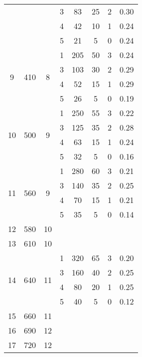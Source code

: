 \begin{longtable}[c]{|c|c|c|c|c|c|c|c|}
    & & & 3 & 83 & 25 & 2 & 0.30 \\\cline{4-8}
    & & & 4 & 42 & 10 & 1 & 0.24 \\\cline{4-8}
    & & & 5 & 21 & 5 & 0 & 0.24 \\\hline
    \multirow{4}{*}{9} & \multirow{4}{*}{410} & \multirow{4}{*}{8} & 1 & 205 & 50 & 3 & 0.24 \\\cline{4-8}
    & & & 3 & 103 & 30 & 2 & 0.29 \\\cline{4-8}
    & & & 4 & 52 & 15 & 1 & 0.29 \\\cline{4-8}
    & & & 5 & 26 & 5 & 0 & 0.19 \\\hline
    \multirow{4}{*}{10} & \multirow{4}{*}{500} & \multirow{4}{*}{9} & 1 & 250 & 55 & 3 & 0.22 \\\cline{4-8}
    & & & 3 & 125 & 35 & 2 & 0.28 \\\cline{4-8}
    & & & 4 & 63 & 15 & 1 & 0.24 \\\cline{4-8}
    & & & 5 & 32 & 5 & 0 & 0.16 \\\hline
    \multirow{4}{*}{11} & \multirow{4}{*}{560} & \multirow{4}{*}{9} & 1 & 280 & 60 & 3 & 0.21 \\\cline{4-8}
    & & & 3 & 140 & 35 & 2 & 0.25 \\\cline{4-8}
    & & & 4 & 70 & 15 & 1 & 0.21 \\\cline{4-8}
    & & & 5 & 35 & 5 & 0 & 0.14 \\\hline
    \multirow{1}{*}{12} & \multirow{1}{*}{580} & \multirow{1}{*}{10} & & & & & \\\hline
    \multirow{1}{*}{13} & \multirow{1}{*}{610} & \multirow{1}{*}{10} & & & & & \\\hline
    \multirow{4}{*}{14} & \multirow{4}{*}{640} & \multirow{4}{*}{11} & 1 & 320 & 65 & 3 & 0.20 \\\cline{4-8}
    & & & 3 & 160 & 40 & 2 & 0.25 \\\cline{4-8}
    & & & 4 & 80 & 20 & 1 & 0.25 \\\cline{4-8}
    & & & 5 & 40 & 5 & 0 & 0.12 \\\hline
    \multirow{1}{*}{15} & \multirow{1}{*}{660} & \multirow{1}{*}{11} & & & & & \\\hline
    \multirow{1}{*}{16} & \multirow{1}{*}{690} & \multirow{1}{*}{12} & & & & & \\\hline
    \multirow{1}{*}{17} & \multirow{1}{*}{720} & \multirow{1}{*}{12} & & & & & \\\hline
\end{longtable}


